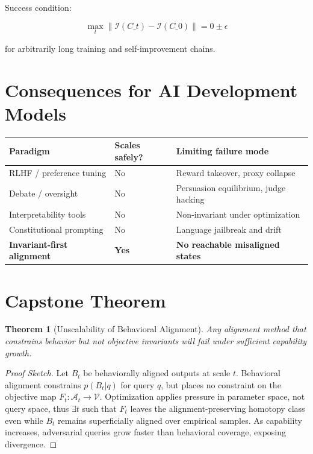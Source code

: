 \documentclass[11pt,a4paper]{article}
\theoremstyle{plain}
\newtheorem{theorem}{Theorem}[section]
\theoremstyle{definition}
\theoremstyle{remark}
\numberwithin{equation}{section}
\begin{document}
Success condition:

\[
\max_t \big\| \mathcal{I}(C\_t) - \mathcal{I}(C\_0) \big\| = 0 \pm \epsilon
\]

for arbitrarily long training and self-improvement chains.

\section{Consequences for AI Development Models}

\begin{table}[H]
\centering
\begin{tabular}{lll}
\toprule
Paradigm & Scales safely? & Limiting failure mode \\
\midrule
RLHF / preference tuning & No & Reward takeover, proxy collapse \\
Debate / oversight & No & Persuasion equilibrium, judge hacking \\
Interpretability tools & No & Non-invariant under optimization \\
Constitutional prompting & No & Language jailbreak and drift \\
\textbf{Invariant-first alignment} & \textbf{Yes} & \textbf{No reachable misaligned states} \\
\bottomrule
\end{tabular}
\end{table}

\section{Capstone Theorem}

\begin{theorem}[Unscalability of Behavioral Alignment]
Any alignment method that constrains behavior but not objective invariants will fail under sufficient capability growth.
\end{theorem}

\begin{proof}[Proof Sketch]
Let $B_t$ be behaviorally aligned outputs at scale $t$. Behavioral alignment constrains $p(B_t | q)$ for query $q$, but places no constraint on the objective map $F_t : \mathcal{A}_t \to \mathcal{V}$. Optimization applies pressure in parameter space, not query space, thus $\exists t$ such that $F_t$ leaves the alignment-preserving homotopy class even while $B_t$ remains superficially aligned over empirical samples. As capability increases, adversarial queries grow faster than behavioral coverage, exposing divergence.
\end{proof}
\end{document}
